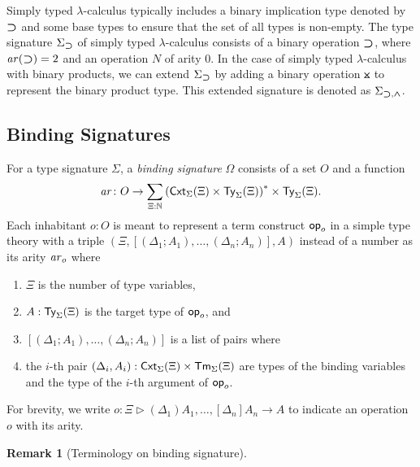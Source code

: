 \documentclass[acmsmall,screen]{acmart}
\theoremstyle{acmdefinition}
\newtheorem{remark}[theorem]{Remark}}
\begin{document}
\begin{example}\label{ex:implication}
  Simply typed $\lambda$-calculus typically includes a binary implication type denoted by $\mathbin{\bm{\supset}}$ and some base types to ensure that the set of all types is non-empty.
  The type signature $\Sigma_{\mathbin{\bm{\supset}}}$ of simply typed $\lambda$-calculus consists of a binary operation $\mathbin{\bm{\supset}}$, where $\mathit{ar}(\mathbin{\bm{\supset}}) = 2$ and an operation $N$ of arity $0$.
  In the case of simply typed $\lambda$-calculus with binary products, we can extend $\Sigma_{\mathbin{\bm{\supset}}}$ by adding a binary operation $\btimes$ to represent the binary product type.
  This extended signature is denoted as $\Sigma_{\mathbin{\bm{\supset}}, \mathbin{\bm{\wedge}}}$.
\end{example}

\subsection{Binding Signatures}
\begin{definition}\label{def:binding-signature}
  For a type signature $\Sigma$, a \emph{binding signature} $\Omega$ consists of a set $O$ and a function
  \[
    \mathit{ar}\colon O \to \sum_{\Xi : \mathbb{N}} \left(\mathsf{Cxt}_\Sigma(\Xi) \times \mathsf{Ty}_\Sigma(\Xi)\right)^* \times \mathsf{Ty}_\Sigma(\Xi).
  \]
  Each inhabitant $o: O$ is meant to represent a term construct $\mathsf{op}_o$ in a simple type theory with a triple $\left(\Xi, \left[\left(\Delta_1; A_1\right), \ldots, \left(\Delta_{n}; A_{n}\right) \right], A\right)$
  instead of a number as its arity $\mathit{ar}_o$ where
  \begin{enumerate}
    \item $\Xi$ is the number of type variables, 
    \item $A : \mathsf{Ty}_\Sigma(\Xi)$ is the target type of $\mathsf{op}_o$, and
    \item $\left[\left(\Delta_1; A_{1}\right), \ldots, \left(\Delta_{n}; A_{n}\right) \right]$ is a list of pairs where
    \item the $i$-th pair $(\Delta_i, A_i) :\mathsf{Cxt}_{\Sigma}(\Xi) \times \mathsf{Tm}_{\Sigma}(\Xi)$ are types of the binding variables and the type of the $i$-th argument of $\mathsf{op}_{o}$.
  \end{enumerate}
  For brevity, we write $o \colon \Xi \rhd (\Delta_1)A_{1}, \ldots, \left[\Delta_{n}\right] A_{n} \to A$ to indicate an operation $o$ with its arity. 
\end{definition}
\begin{remark}[Terminology on binding signature]
  \cite{Aczel1978,Fiore2010}
\end{remark}
\end{document}

